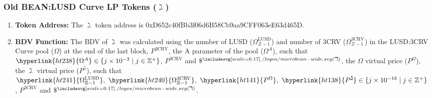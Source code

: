 \documentclass[class=article, crop=false]{standalone}
\begin{document}
    \subsubsection{Old BEAN:LUSD Curve LP Tokens ($\gimel$)}
   \begin{enumerate}
        \item \textbf{Token Address:} The \hyperlink{ht108}{$\gimel$} token address is 0xD652c40fBb3f06d6B58Cb9aa9CFF063eE63d465D.
        \item \textbf{BDV Function:} The BDV of \hyperlink{ht108}{$\gimel$} was calculated using the number of LUSD (\hyperlink{ht241}{$\Omega_{\Xi-1}^{\text{LUSD}}$}) and number of 3CRV (\hyperlink{ht240}{$\Omega_{\Xi-1}^{\text{3CRV}}$}) in the LUSD:3CRV Curve pool (\hyperlink{ht237}{$\Omega$}) at the end of the last block, \hyperlink{ht136}{$P^{\text{3CRV}}$}, the A parameter of the pool (\hyperlink{ht238}{$\Omega^{A}$}), such that $\hyperlink{ht238}{\Omega^{A}} \in \{j \times 10^{-2} \mid j \in \mathbb{Z}^{+} \}$, \hyperlink{ht136}{$P^{\text{3CRV}}$} and \hyperlink{ht1a}{$\$^{\bean(\daleth)}$}, the \hyperlink{ht237}{$\Omega$} virtual price (\hyperlink{ht141}{$P^{\Omega}$}), the \hyperlink{ht108}{$\gimel$} virtual price (\hyperlink{ht138}{$P^{\gimel}$}), such that $\hyperlink{ht241}{\Omega_{\Xi-1}^{\text{LUSD}}},\ \hyperlink{ht240}{\Omega_{\Xi-1}^{\text{3CRV}}},\ \hyperlink{ht141}{P^{\Omega}},\ \hyperlink{ht138}{P^{\gimel}} \in \{j \times 10^{-18} \mid j \in \mathbb{Z}^{+} \}$, \hyperlink{ht136}{$P^{\text{3CRV}}$} and \hyperlink{ht1a}{$\$^{\bean(\daleth)}$}. 


\end{enumerate}
\end{document}
